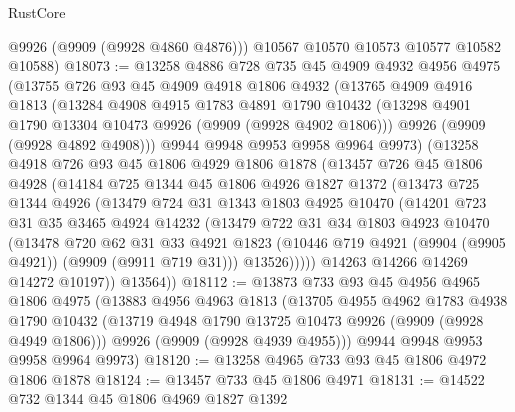 \begin{lexlean}{RustCore}
\begin{coremodule}
        @9926
        (@9909 (@9928 @4860 @4876)))
      @10567
      @10570
      @10573
      @10577
      @10582
      @10588)
@18073 := @13258
    @4886
    @728
    @735
    @45
    @4909
    @4932
    @4956
    @4975
    (@13755
      @726
      @93
      @45
      @4909
      @4918
      @1806
      @4932
      (@13765
        @4909
        @4916
        @1813
        (@13284
          @4908
          @4915
          @1783
          @4891
          @1790
          @10432
          (@13298 @4901 @1790 @13304 @10473 @9926 (@9909 (@9928 @4902 @1806)))
          @9926
          (@9909 (@9928 @4892 @4908)))
        @9944
        @9948
        @9953
        @9958
        @9964
        @9973)
      (@13258
        @4918
        @726
        @93
        @45
        @1806
        @4929
        @1806
        @1878
        (@13457
          @726
          @45
          @1806
          @4928
          (@14184
            @725
            @1344
            @45
            @1806
            @4926
            @1827
            @1372
            (@13473
              @725
              @1344
              @4926
              (@13479
                @724
                @31
                @1343
                @1803
                @4925
                @10470
                (@14201
                  @723
                  @31
                  @35
                  @3465
                  @4924
                  @14232
                  (@13479
                    @722
                    @31
                    @34
                    @1803
                    @4923
                    @10470
                    (@13478
                      @720
                      @62
                      @31
                      @33
                      @4921
                      @1823
                      (@10446 @719 @4921 (@9904 (@9905 @4921)) (@9909 (@9911 @719 @31)))
                      @13526)))))
            @14263
            @14266
            @14269
            @14272
            @10197))
        @13564))
@18112 := @13873
    @733
    @93
    @45
    @4956
    @4965
    @1806
    @4975
    (@13883
      @4956
      @4963
      @1813
      (@13705
        @4955
        @4962
        @1783
        @4938
        @1790
        @10432
        (@13719 @4948 @1790 @13725 @10473 @9926 (@9909 (@9928 @4949 @1806)))
        @9926
        (@9909 (@9928 @4939 @4955)))
      @9944
      @9948
      @9953
      @9958
      @9964
      @9973)
@18120 := @13258 @4965 @733 @93 @45 @1806 @4972 @1806 @1878
@18124 := @13457 @733 @45 @1806 @4971
@18131 := @14522 @732 @1344 @45 @1806 @4969 @1827 @1392

\end{coremodule}
\end{lexlean}

